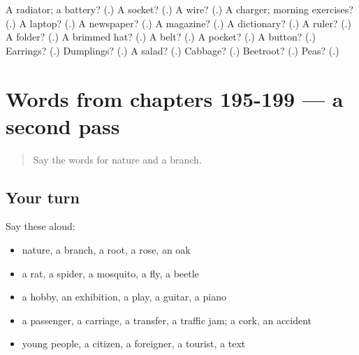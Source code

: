 \begin{tcolorbox}[breakable,colback=teal!4,colframe=teal!35!black,title={Before you move on}]
A radiator; a battery? (\textbf{}.) A socket? (\textbf{}.) A wire? (\textbf{}.) A charger; morning exercises? (\textbf{}.) A laptop? (\textbf{}.) A newspaper? (\textbf{}.) A magazine? (\textbf{}.) A dictionary? (\textbf{}.) A ruler? (\textbf{}.) A folder? (\textbf{}.) A brimmed hat? (\textbf{}.) A belt? (\textbf{}.) A pocket? (\textbf{}.) A button? (\textbf{}.) Earrings? (\textbf{}.) Dumplings? (\textbf{}.) A salad? (\textbf{}.) Cabbage? (\textbf{}.) Beetroot? (\textbf{}.) Peas? (\textbf{}.)
\end{tcolorbox}
\section[(dialogue)]{Words from chapters 195-199 — a second pass}

\label{lesson:RU-R199-second-pass-words-from-chapters-195-199}



\begin{quote}
Say the words for nature and a branch.
\end{quote}

\subsection*{Your turn}
Say these aloud:

\begin{itemize}
\raggedright
  \item nature, a branch, a root, a rose, an oak
  \item a rat, a spider, a mosquito, a fly, a beetle
  \item a hobby, an exhibition, a play, a guitar, a piano
  \item a passenger, a carriage, a transfer, a traffic jam; a cork, an accident
  \item young people, a citizen, a foreigner, a tourist, a text
\end{itemize}

